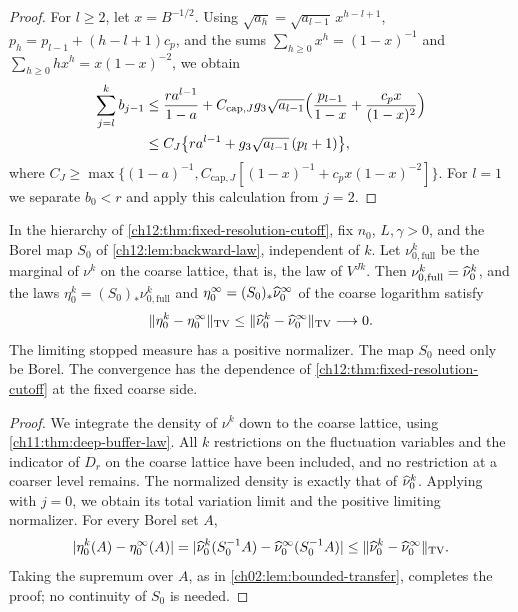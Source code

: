 \begin{proof}
For $l\ge2$, let $x=B^{-1/2}$. Using $\sqrt{a_h}=\sqrt{a_{l-1}}\,x^{h-l+1}$, $p_h=p_{l-1}+(h-l+1)c_p$, and the sums $\sum_{h\ge0}x^h=(1-x)^{-1}$ and $\sum_{h\ge0}hx^h=x(1-x)^{-2}$, we obtain
\begin{equation}
 \begin{split}
 \sum_{j=l}^kb_{j-1}
 &\le\frac{ra^{l-1}}{1-a}+C_{\mathrm{cap},J}g_3\sqrt{a_{l-1}}\Bigl(\frac{p_{l-1}}{1-x}+\frac{c_px}{(1-x)^2}\Bigr)\\
 &\le C_J\bigl\{ra^{l-1}+g_3\sqrt{a_{l-1}}\,(p_l+1)\bigr\},
 \end{split}\label{ch12:eq:calculation-18}
\end{equation}
where $C_J\ge\max\{(1-a)^{-1},C_{\mathrm{cap},J}[(1-x)^{-1}+c_px(1-x)^{-2}]\}$. For $l=1$ we separate $b_0<r$ and apply this calculation from $j=2$.
\end{proof}

\begin{lemma}\label{ch12:lem:terminal-selector-tv}
In the hierarchy of \cref{ch12:thm:fixed-resolution-cutoff}, fix $n_0$, $L,\gamma>0$, and the Borel map $S_0$ of \cref{ch12:lem:backward-law}, independent of $k$. Let $\nu_{0,\mathrm{full}}^k$ be the marginal of $\nu^k$ on the coarse lattice, that is, the law of $V^{Jk}$. Then $\nu_{0,\mathrm{full}}^k=\widehat\nu_0^k$, and the laws $\eta_0^k=(S_0)_*\nu_{0,\mathrm{full}}^k$ and $\eta_0^\infty=(S_0)_*\widehat\nu_0^\infty$ of the coarse logarithm satisfy
\[
 \lVert \eta_0^k-\eta_0^\infty\rVert_{\operatorname{TV}}\le\lVert \widehat\nu_0^k-\widehat\nu_0^\infty\rVert_{\operatorname{TV}}\longrightarrow0 .
\]
The limiting stopped measure has a positive normalizer. The map $S_0$ need only be Borel. The convergence has the dependence of \cref{ch12:thm:fixed-resolution-cutoff} at the fixed coarse side.
\end{lemma}

\begin{proof}
We integrate the density of $\nu^k$ down to the coarse lattice, using \cref{ch11:thm:deep-buffer-law}. All $k$ restrictions on the fluctuation variables and the indicator of $D_r$ on the coarse lattice have been included, and no restriction at a coarser level remains. The normalized density is exactly that of $\widehat\nu_0^k$. Applying  with $j=0$, we obtain its total variation limit and the positive limiting normalizer. For every Borel set $A$,
\[
 \lvert \eta_0^k(A)-\eta_0^\infty(A)\rvert=\lvert \widehat\nu_0^k(S_0^{-1}A)-\widehat\nu_0^\infty(S_0^{-1}A)\rvert\le\lVert \widehat\nu_0^k-\widehat\nu_0^\infty\rVert_{\operatorname{TV}}.
\]
Taking the supremum over $A$, as in \cref{ch02:lem:bounded-transfer}, completes the proof; no continuity of $S_0$ is needed.
\end{proof}

